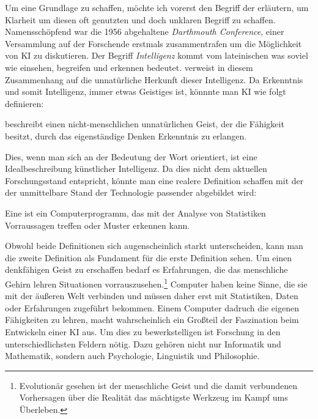 \documentclass[12pt,german,ngerman]{report}
\begin{document}
    Um eine Grundlage zu schaffen, möchte ich vorerst den Begriff der 
    erläutern, um Klarheit um diesen oft genutzten und doch unklaren Begriff zu schaffen.
    Namensschöpfend war die 1956 abgehaltene \emph{Darthmouth Conference}\cite[57]{buchanan2005very}, 
    einer Versammlung auf der 
    Forschende erstmals zusammentrafen um die Möglichkeit von KI zu diskutieren.
    Der Begriff \emph{Intelligenz} kommt vom lateinischen  was soviel wie
    einsehen, begreifen und erkennen bedeutet.\cite{piaget2000psychologie}
     verweist in diesem Zusammenhang auf die unnatürliche Herkunft dieser Intelligenz.
    Da Erkenntnis\cite{duden2021erkenntnis} und somit Intelligenz, immer etwas Geistiges ist, könnnte
    man KI wie folgt definieren:
    \begin{displayquote}
         beschreibt einen nicht-menschlichen
        unnatürlichen Geist, der die Fähigkeit besitzt, 
        durch das eigenständige Denken Erkenntnis zu erlangen.
    \end{displayquote}
    Dies, wenn man sich an der Bedeutung der Wort orientiert, ist eine Idealbeschreibung künstlicher Intelligenz.
    Da dies nicht dem aktuellen Forschungsstand entspricht, könnte man eine realere Definition schaffen mit der der unmittelbare
    Stand der Technologie passender abgebildet wird:
    \begin{displayquote}
        Eine  ist ein Computerprogramm, das 
        mit der Analyse von Statistiken Vorraussagen treffen oder Muster erkennen kann.
    \end{displayquote}
    Obwohl beide Definitionen sich augenscheinlich starkt unterscheiden, kann man die zweite Definition als Fundament für
    die erste Definition sehen. Um einen denkfähigen Geist zu erschaffen bedarf es Erfahrungen, die das menschliche Gehirn lehren
    Situationen vorrauszusehen.\footnote{Evolutionär gesehen ist der menschliche Geist und die 
    damit verbundenen Vorhersagen über die Realität
    das mächtigste Werkzeug im Kampf ums Überleben.}
    Computer haben keine Sinne, die sie mit der äußeren Welt verbinden und 
    müssen daher erst mit Statistiken, Daten oder Erfahrungen zugeführt bekommen.
    Einem Computer dadruch die eigenen Fähigkeiten zu lehren, macht wahrscheinlich ein Großteil der Faszination
    beim Entwickeln einer KI aus. Um dies zu bewerkstelligen ist Forschung in den unterschiedlichsten Feldern nötig.
    Dazu gehören nicht nur Informatik und Mathematik, sondern auch Psychologie, Linguistik und Philosophie\cite{buchanan2005very}.\\
\end{document}
